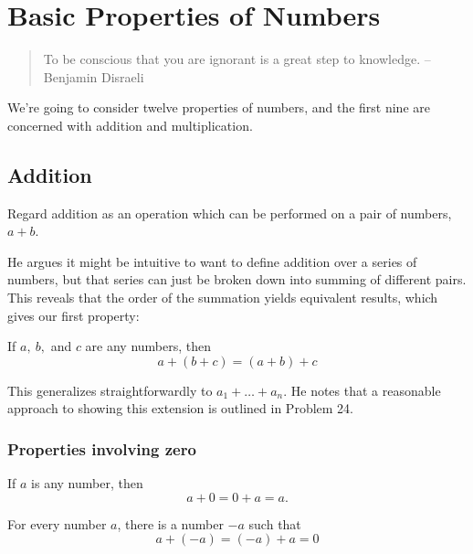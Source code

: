 \chapter{Basic Properties of Numbers}

\begin{quote}
    To be conscious that you are ignorant is a great step to knowledge.
    \hfill -- Benjamin Disraeli
\end{quote}

We're going to consider twelve properties of numbers, and the first nine are concerned
with addition and multiplication.

\section{Addition}

\begin{definition}
    Regard addition as an operation which can be performed on a pair of numbers, $a + b$.
\end{definition}

He argues it might be intuitive to want to define addition over a series of numbers, but
that series can just be broken down into summing of different pairs. This reveals that the
order of the summation yields equivalent results, which gives our first property:

\begin{property}
    If $a,~b,$ and $c$ are any numbers, then
    $$
    a + (b + c) = (a + b) + c
    $$
\end{property}

This generalizes straightforwardly to $a_1 + \ldots + a_n$. He notes that a reasonable
approach to showing this extension is outlined in Problem 24. 

\subsection{Properties involving zero}

\begin{property}\label{prop:additiveidentity}
    If $a$ is any number, then 
    $$
    a + 0 = 0 + a = a.
    $$
\end{property}

\begin{property}\label{prop:additiveinverse}
    For every number $a$, there is a number $-a$ such that
    $$
    a + (-a) = (-a) + a = 0
    $$
\end{property}

